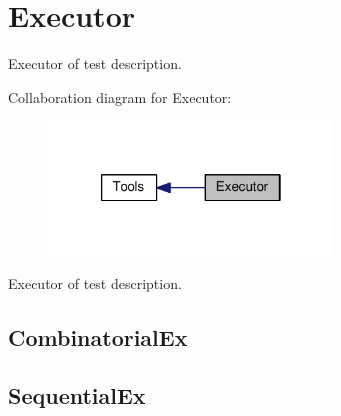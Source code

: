 \hypertarget{group__Executor}{\section{Executor}
\label{group__Executor}
}


Executor of test description.  


Collaboration diagram for Executor\-:
\nopagebreak
\begin{figure}[H]
\begin{center}
\leavevmode
\includegraphics[width=214pt]{group__Executor}
\end{center}
\end{figure}
Executor of test description. \hypertarget{group__Executor_CombinatorialEx}{}\subsection{Combinatorial\-Ex}\label{group__Executor_CombinatorialEx}
\hypertarget{sequential.py_SequentialEx}{}\subsection{Sequential\-Ex}\label{sequential.py_SequentialEx}
